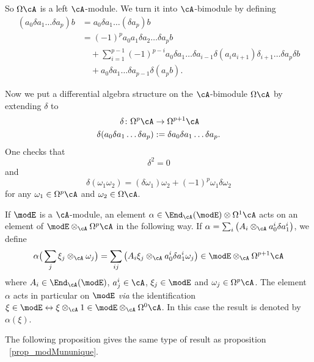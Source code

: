 So $\Omega\cA$ is a left $\cA$-module. We turn it into $\cA$-bimodule by defining
\begin{equation}
\begin{split}
(a_0\delta a_1\ldots\delta a_p)b&=a_0\delta a_1\ldots(\delta a_p)b\\
		&=(-1)^pa_0a_1\delta a_2\ldots \delta a_p b\\
		&\quad+\sum_{i=1}^{p-1}(-1)^{p-i}a_0 \delta a_1\ldots \delta a_{i-1}\delta(a_ia_{i+1})\delta_{i+1}\ldots\delta a_p\delta b\\
		&\quad+a_0\delta a_1\ldots\delta a_{p-1}\delta(a_pb).
\end{split}
\end{equation}

Now we put a differential algebra structure on the $\cA$-bimodule $\Omega\cA$ by extending $\delta$ to
\begin{equation}
\begin{aligned}
 \delta\colon\Omega^p\cA&\to \Omega^{p+1}\cA \\
\delta(a_0\delta a_1\ldots\delta a_p)&:= \delta a_0\delta a_1\ldots \delta a_p.
\end{aligned}
\end{equation}
One checks that
\[
  \delta^2=0
\]
and
\begin{equation}
  \delta(\omega_1\omega_2)=(\delta\omega_1)\omega_2+(-1)^p\omega_1\delta\omega_2
\end{equation}
for any $\omega_1\in\Omega^p\cA$ and $\omega_2\in\Omega\cA$.

If $\modE$ is a $\cA$-module, an element $\alpha\in\End_{\cA}(\modE)\otimes\Omega^1\cA$ acts on an element of $\modE\otimes_{\cA}\Omega^p\cA$ in the following way. If $\alpha=\sum_i\big( A_i\otimes_{\cA}a^i_0\delta a^i_1 \big)$, we define
\begin{equation}		\label{EqActallphaEOAp}
\alpha\big( \sum_j\xi_j\otimes_{\cA}\omega_j \big)=\sum_{ij}\big( A_i\xi_j\otimes_{\cA}a^i_0\delta a^i_1\omega_j \big)\in\modE\otimes_{\cA}\Omega^{p+1}\cA
\end{equation}
where $A_i\in\End_{\cA}(\modE)$, $a^i_j\in\cA$, $\xi_j\in\modE$ and $\omega_j\in\Omega^p\cA$. The element $\alpha$ acts in particular on $\modE$ \emph{via} the identification $\xi\in\modE\leftrightarrow\xi\otimes_{\cA}1\in\modE\otimes_{\cA}\Omega^0\cA$. In this case the result is denoted by $\alpha(\xi)$.

The following proposition gives the same type of result as proposition ~\ref{prop_modMununique}.

